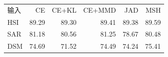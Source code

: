 \begin{tabular}{lrrrrr}
\toprule
输入 & CE & CE+KL & CE+MMD & JAD & MSH \\
HSI & 89.29 & 89.30 & 89.41 & 89.38 & 89.59 \\
SAR & 81.18 & 80.56 & 81.25 & 78.67 & 80.48 \\
DSM & 74.69 & 71.52 & 74.49 & 74.24 & 75.41 \\
\bottomrule
\end{tabular}
